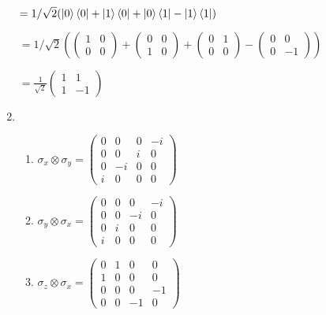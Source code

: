 \documentclass[letter,twoside,12pt]{article}
\begin{document}
\begin{enumerate}
$ = 1/\sqrt{2}(\ket{0}\bra{0}+\ket{1}\bra{0}+\ket{0}\bra{1}-\ket{1}\bra{1})  $

$ = 1/\sqrt{2}(\begin{pmatrix}
1 & 0 
\\ 0 & 0
\end{pmatrix}+\begin{pmatrix}
 0 & 0 
\\ 1 & 0
\end{pmatrix}+\begin{pmatrix}
 0 & 1 
\\ 0 & 0
\end{pmatrix}-\begin{pmatrix}
 0 & 0 
\\ 0 & -1
\end{pmatrix})  $

$ = \frac{1}{\sqrt{2}}\begin{pmatrix}
 1 & 1 
\\ 1 & -1
\end{pmatrix} $

\item \begin{enumerate}
\item $ \sigma_x \otimes \sigma_y = \begin{pmatrix}
0 & 0 & 0 & -i 
\\ 0 & 0 & i & 0
\\ 0 & -i & 0 & 0
\\ i & 0 & 0 & 0
\end{pmatrix}$

\item  $ \sigma_y \otimes \sigma_x = \begin{pmatrix}
0 & 0 & 0 & -i 
\\ 0 & 0 & -i & 0
\\ 0 & i & 0 & 0
\\ i & 0 & 0 & 0
\end{pmatrix}$

\item $ \sigma_z \otimes \sigma_x = \begin{pmatrix}
0 & 1 & 0 & 0 
\\ 1 & 0 & 0 & 0
\\ 0 & 0 & 0 & -1
\\ 0 & 0 & -1 & 0
\end{pmatrix}$ 


\end{enumerate}
\end{enumerate}
\end{document}
